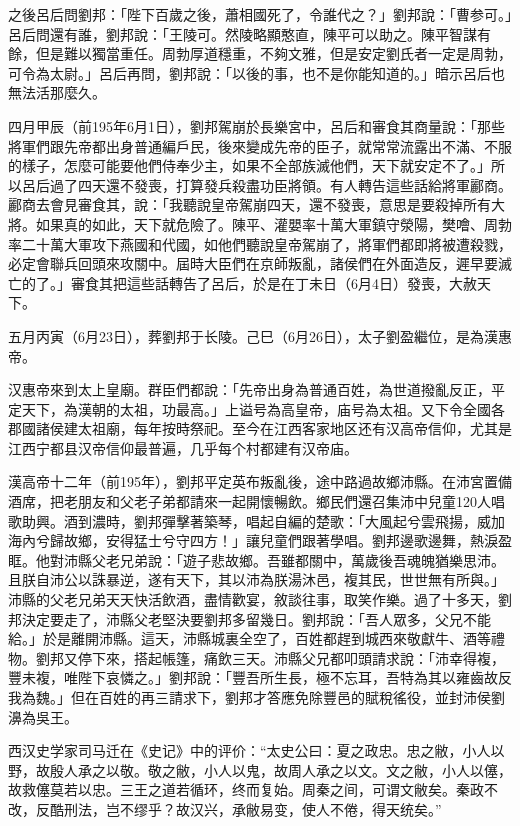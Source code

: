 之後呂后問劉邦：「陛下百歲之後，蕭相國死了，令誰代之？」劉邦說：「曹参可。」呂后問還有誰，劉邦說：「王陵可。然陵略顯憨直，陳平可以助之。陳平智謀有餘，但是難以獨當重任。周勃厚道穩重，不夠文雅，但是安定劉氏者一定是周勃，可令為太尉。」呂后再問，劉邦說：「以後的事，也不是你能知道的。」暗示呂后也無法活那麼久。

四月甲辰（前195年6月1日），劉邦駕崩於長樂宮中，呂后和審食其商量說：「那些將軍們跟先帝都出身普通編戶民，後來變成先帝的臣子，就常常流露出不滿、不服的樣子，怎麼可能要他們侍奉少主，如果不全部族滅他們，天下就安定不了。」所以呂后過了四天還不發喪，打算發兵殺盡功臣將領。有人轉告這些話給將軍酈商。酈商去會見審食其，說：「我聽說皇帝駕崩四天，還不發喪，意思是要殺掉所有大將。如果真的如此，天下就危險了。陳平、灌嬰率十萬大軍鎮守滎陽，樊噲、周勃率二十萬大軍攻下燕國和代國，如他們聽說皇帝駕崩了，將軍們都即將被遭殺戮，必定會聯兵回頭來攻關中。屆時大臣們在京師叛亂，諸侯們在外面造反，遲早要滅亡的了。」審食其把這些話轉告了呂后，於是在丁未日（6月4日）發喪，大赦天下。

五月丙寅（6月23日），葬劉邦于长陵。己巳（6月26日），太子劉盈繼位，是為漢惠帝。

汉惠帝來到太上皇廟。群臣們都說：「先帝出身為普通百姓，為世道撥亂反正，平定天下，為漢朝的太祖，功最高。」上谥号為高皇帝，庙号為太祖。又下令全國各郡國諸侯建太祖廟，每年按時祭祀。至今在江西客家地区还有汉高帝信仰，尤其是江西宁都县汉帝信仰最普遍，几乎每个村都建有汉帝庙。

漢高帝十二年（前195年），劉邦平定英布叛亂後，途中路過故鄉沛縣。在沛宮置備酒席，把老朋友和父老子弟都請來一起開懷暢飲。鄉民們還召集沛中兒童120人唱歌助興。酒到濃時，劉邦彈擊著築琴，唱起自編的楚歌：「大風起兮雲飛揚，威加海內兮歸故鄉，安得猛士兮守四方！」讓兒童們跟著學唱。劉邦邊歌邊舞，熱淚盈眶。他對沛縣父老兄弟說：「遊子悲故鄉。吾雖都關中，萬歲後吾魂魄猶樂思沛。且朕自沛公以誅暴逆，遂有天下，其以沛為朕湯沐邑，複其民，世世無有所與。」沛縣的父老兄弟天天快活飲酒，盡情歡宴，敘談往事，取笑作樂。過了十多天，劉邦決定要走了，沛縣父老堅決要劉邦多留幾日。劉邦說：「吾人眾多，父兄不能給。」於是離開沛縣。這天，沛縣城裏全空了，百姓都趕到城西來敬獻牛、酒等禮物。劉邦又停下來，搭起帳篷，痛飲三天。沛縣父兄都叩頭請求說：「沛幸得複，豐未複，唯陛下哀憐之。」劉邦說：「豐吾所生長，極不忘耳，吾特為其以雍齒故反我為魏。」但在百姓的再三請求下，劉邦才答應免除豐邑的賦稅徭役，並封沛侯劉濞為吳王。

西汉史学家司马迁在《史记》中的评价：“太史公曰：夏之政忠。忠之敝，小人以野，故殷人承之以敬。敬之敝，小人以鬼，故周人承之以文。文之敝，小人以僿，故救僿莫若以忠。三王之道若循环，终而复始。周秦之间，可谓文敝矣。秦政不改，反酷刑法，岂不缪乎？故汉兴，承敝易变，使人不倦，得天统矣。”

